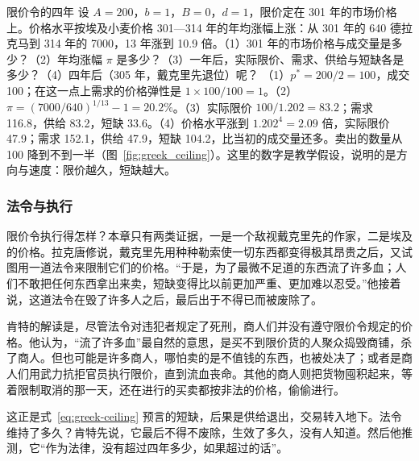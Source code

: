 \begin{example}{限价令的四年}\label{ex:greek-ceiling}
设 $A=200$，$b=1$，$B=0$，$d=1$，限价定在 301 年的市场价格上。价格水平按埃及小麦价格 301—314 年的年均涨幅上涨：从 301 年的 640 德拉克马到 314 年的 7000，13 年涨到 10.9 倍。（1）301 年的市场价格与成交量是多少？（2）年均涨幅 $\pi$ 是多少？（3）一年后，实际限价、需求、供给与短缺各是多少？（4）四年后（305 年，戴克里先退位）呢？
\solution （1）$p^{*}=200/2=100$，成交 100；在这一点上需求的价格弹性是 $1\times100/100=1$。（2）$\pi=(7000/640)^{1/13}-1=20.2\%$。（3）实际限价 $100/1.202=83.2$；需求 116.8，供给 83.2，短缺 33.6。（4）价格水平涨到 $1.202^{4}=2.09$ 倍，实际限价 47.9；需求 152.1，供给 47.9，短缺 104.2，比当初的成交量还多。卖出的数量从 100 降到不到一半（图~\ref{fig:greek_ceiling}）。这里的数字是教学假设，说明的是方向与速度：限价越久，短缺越大。
\end{example}


\subsubsection{法令与执行}
限价令执行得怎样？本章只有两类证据，一是一个敌视戴克里先的作家，二是埃及的价格。拉克唐修说，戴克里先用种种勒索使一切东西都变得极其昂贵之后，又试图用一道法令来限制它们的价格。“于是，为了最微不足道的东西流了许多血；人们不敢把任何东西拿出来卖，短缺变得比以前更加严重、更加难以忍受。”他接着说，这道法令在毁了许多人之后，最后出于不得已而被废除了\cite{lactantius}。

肯特的解读是，尽管法令对违犯者规定了死刑，商人们并没有遵守限价令规定的价格。他认为，“流了许多血”最自然的意思，是买不到限价货的人聚众捣毁商铺，杀了商人。但也可能是许多商人，哪怕卖的是不值钱的东西，也被处决了；或者是商人们用武力抗拒官员执行限价，直到流血丧命。其他的商人则把货物囤积起来，等着限制取消的那一天，还在进行的买卖都按非法的价格，偷偷进行\cite{kent1920}。

这正是式~\eqref{eq:greek-ceiling} 预言的短缺，后果是供给退出，交易转入地下。法令维持了多久？肯特先说，它最后不得不废除，生效了多久，没有人知道。然后他推测，它“作为法律，没有超过四年多少，如果超过的话”\cite{kent1920}。

